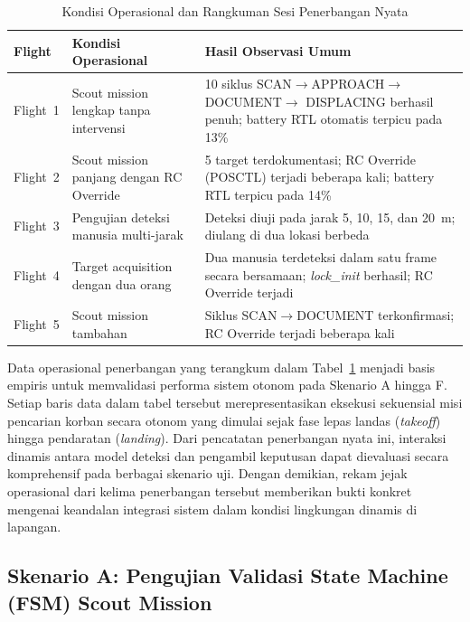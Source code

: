 \begin{table}[H]
	\centering
	\caption{Kondisi Operasional dan Rangkuman Sesi Penerbangan Nyata}
	\label{tab:skenario_validasi}
	\renewcommand{\arraystretch}{1.2}
	\begin{tabular}{|p{1.5cm}|p{4cm}|p{7cm}|}
		\hline
		\textbf{Flight} & \textbf{Kondisi Operasional} & \textbf{Hasil Observasi Umum} \\ \hline
		
		Flight~1 &
		Scout mission lengkap tanpa intervensi &
		10 siklus SCAN$\to$APPROACH$\to$DOCUMENT$\to$
		DISPLACING berhasil penuh; battery RTL otomatis terpicu pada 13\% \\ \hline
		
		Flight~2 &
		Scout mission panjang dengan RC Override &
		5 target terdokumentasi; RC Override (POSCTL) terjadi beberapa kali; battery RTL terpicu pada 14\% \\ \hline
		
		Flight~3 &
		Pengujian deteksi manusia multi-jarak &
		Deteksi diuji pada jarak 5, 10, 15, dan 20~m; diulang di dua lokasi berbeda \\ \hline
		
		Flight~4 &
		Target acquisition dengan dua orang &
		Dua manusia terdeteksi dalam satu frame secara bersamaan; \textit{lock\_init} berhasil; RC Override terjadi \\ \hline
		
		Flight~5 &
		Scout mission tambahan &
		Siklus SCAN$\to$DOCUMENT terkonfirmasi; RC Override terjadi beberapa kali \\ \hline
	\end{tabular}
\end{table}

Data operasional penerbangan yang terangkum dalam Tabel~\ref{tab:skenario_validasi} menjadi basis empiris untuk memvalidasi performa sistem otonom pada Skenario A hingga F. Setiap baris data dalam tabel tersebut merepresentasikan eksekusi sekuensial misi pencarian korban secara otonom yang dimulai sejak fase lepas landas (\textit{takeoff}) hingga pendaratan (\textit{landing}). Dari pencatatan penerbangan nyata ini, interaksi dinamis antara model deteksi dan pengambil keputusan dapat dievaluasi secara komprehensif pada berbagai skenario uji. Dengan demikian, rekam jejak operasional dari kelima penerbangan tersebut memberikan bukti konkret mengenai keandalan integrasi sistem dalam kondisi lingkungan dinamis di lapangan.

\subsection{Skenario A: Pengujian Validasi State Machine (FSM) Scout Mission}

